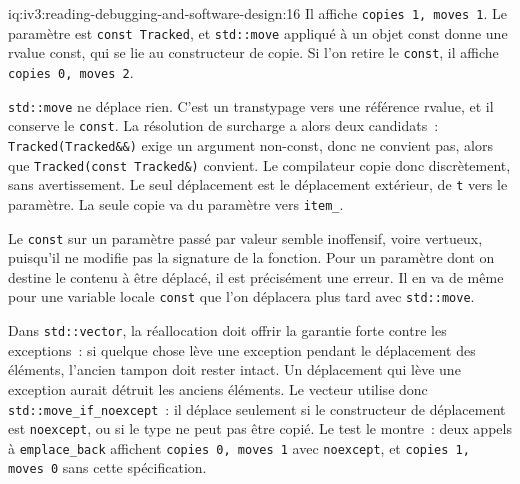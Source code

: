 \begin{solution}{iq:iv3:reading-debugging-and-software-design:16}
Il affiche \texttt{copies 1, moves 1}. Le paramètre est \texttt{const Tracked}, et \texttt{std::move} appliqué à un objet const donne une rvalue const, qui se lie au constructeur de copie. Si l'on retire le \texttt{const}, il affiche \texttt{copies 0, moves 2}.

\texttt{std::move} ne déplace rien. C'est un transtypage vers une référence rvalue, et il conserve le \texttt{const}. La résolution de surcharge a alors deux candidats~: \texttt{Tracked(Tracked\&\&)} exige un argument non-const, donc ne convient pas, alors que \texttt{Tracked(const Tracked\&)} convient. Le compilateur copie donc discrètement, sans avertissement. Le seul déplacement est le déplacement extérieur, de \texttt{t} vers le paramètre. La seule copie va du paramètre vers \texttt{item\_}.

Le \texttt{const} sur un paramètre passé par valeur semble inoffensif, voire vertueux, puisqu'il ne modifie pas la signature de la fonction. Pour un paramètre dont on destine le contenu à être déplacé, il est précisément une erreur. Il en va de même pour une variable locale \texttt{const} que l'on déplacera plus tard avec \texttt{std::move}.

Dans \texttt{std::vector}, la réallocation doit offrir la garantie forte contre les exceptions~: si quelque chose lève une exception pendant le déplacement des éléments, l'ancien tampon doit rester intact. Un déplacement qui lève une exception aurait détruit les anciens éléments. Le vecteur utilise donc \texttt{std::move\_if\_noexcept}~: il déplace seulement si le constructeur de déplacement est \texttt{noexcept}, ou si le type ne peut pas être copié. Le test le montre~: deux appels à \texttt{emplace\_back} affichent \texttt{copies 0, moves 1} avec \texttt{noexcept}, et \texttt{copies 1, moves 0} sans cette spécification.


\end{solution}


